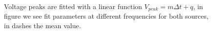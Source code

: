 \begin{figure}
 \centering
 \caption{Voltage peaks are fitted with a linear function $V_{peak} = m \Delta t + q$, in figure we see fit parameters at different frequencies for both sources, in dashes the mean value.}
 \label{fig:lingas_Vpp}
\end{figure}


